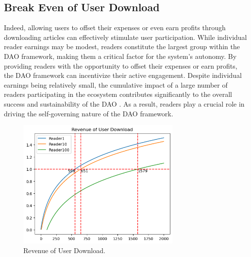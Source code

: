 \documentclass[lettersize,journal]{IEEEtran}
\begin{document}
\subsection{Break Even of User Download}

Indeed, allowing users to offset their expenses or even earn profits through downloading articles can effectively stimulate user participation. While individual reader earnings may be modest, readers constitute the largest group within the DAO framework, making them a critical factor for the system's autonomy.
By providing readers with the opportunity to offset their expenses or earn profits, the DAO framework can incentivize their active engagement. Despite individual earnings being relatively small, the cumulative impact of a large number of readers participating in the ecosystem contributes significantly to the overall success and sustainability of the DAO \cite{leimeister2010collective}. As a result, readers play a crucial role in driving the self-governing nature of the DAO framework.

\begin{figure}[h]
  \centering
  \includegraphics[width=3.2in]{assets/revenue-user-download.png}
  \caption{Revenue of User Download.}
  \label{fig:revenue-user-download}
\end{figure}
\end{document}
